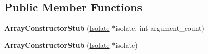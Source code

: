\subsection*{Public Member Functions}
\begin{DoxyCompactItemize}
\item 
{\bfseries Array\+Constructor\+Stub} (\hyperlink{classv8_1_1internal_1_1_isolate}{Isolate} $\ast$isolate, int argument\+\_\+count)\hypertarget{classv8_1_1internal_1_1_array_constructor_stub_ace8064ca0370fc661e2c52326016d7df}{}\label{classv8_1_1internal_1_1_array_constructor_stub_ace8064ca0370fc661e2c52326016d7df}

\item 
{\bfseries Array\+Constructor\+Stub} (\hyperlink{classv8_1_1internal_1_1_isolate}{Isolate} $\ast$isolate)\hypertarget{classv8_1_1internal_1_1_array_constructor_stub_a091aa6dc4cd77eb388afaea10ea0a0d1}{}\label{classv8_1_1internal_1_1_array_constructor_stub_a091aa6dc4cd77eb388afaea10ea0a0d1}

\end{DoxyCompactItemize}
